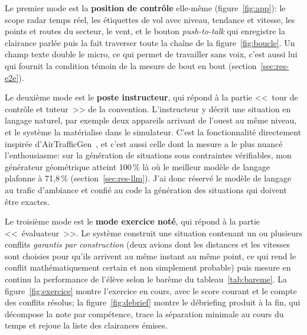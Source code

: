 \documentclass[11pt,a4paper]{article}
\begin{document}
Le premier mode est la \textbf{position de contrôle} elle-même (figure~\ref{fig:app}): le scope radar temps réel, les étiquettes de vol avec niveau, tendance et vitesse, les points et routes du secteur, le vent, et le bouton \emph{push-to-talk} qui enregistre la clairance parlée puis la fait traverser toute la chaîne de la figure~\ref{fig:boucle}. Un champ texte double le micro, ce qui permet de travailler sans voix, c'est aussi lui qui fournit la condition témoin de la mesure de bout en bout (section~\ref{sec:res-e2e}). 

Le deuxième mode est le \textbf{poste instructeur}, qui répond à la partie <<~tour de contrôle et tuteur~>> de la convention. L'instructeur y décrit une situation en langage naturel, par exemple deux appareils arrivant de l'ouest au même niveau, et le système la matérialise dans le simulateur. C'est la fonctionnalité directement inspirée d'AirTrafficGen~\cite{airtrafficgen}, et c'est aussi celle dont la mesure a le plus nuancé l'enthousiasme: sur la génération de situations sous contraintes vérifiables, mon générateur géométrique atteint 100\,\% là où le meilleur modèle de langage plafonne à 71,8\,\% (section~\ref{sec:res-llm}). J'ai donc réservé le modèle de langage au trafic d'ambiance et confié au code la génération des situations qui doivent être exactes. 

Le troisième mode est le \textbf{mode exercice noté}, qui répond à la partie <<~évaluateur~>>. Le système construit une situation contenant un ou plusieurs conflits \emph{garantis par construction} (deux avions dont les distances et les vitesses sont choisies pour qu'ils arrivent au même instant au même point, ce qui rend le conflit mathématiquement certain et non simplement probable) puis mesure en continu la performance de l'élève selon le barème du tableau~\ref{tab:bareme}. La figure~\ref{fig:exercice} montre l'exercice en cours, avec le score courant et le compte des conflits résolus; la figure~\ref{fig:debrief} montre le débriefing produit à la fin, qui décompose la note par compétence, trace la séparation minimale au cours du temps et rejoue la liste des clairances émises. 
\end{document}
